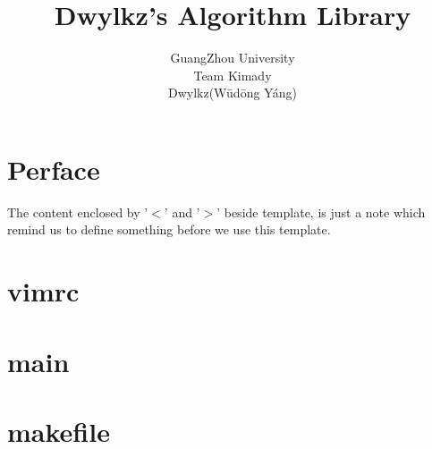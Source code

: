 



\title{\bf Dwylkz's Algorithm Library}
\author{GuangZhou University\\Team Kimady\\{Dwylkz(W\=ud\=ong Y\'ang)}}
\maketitle

\tableofcontents
\newpage
{}

\section{Perface}
  The content enclosed by '$<$' and '$>$' beside template, is
  just a note which remind us to define something before
  we use this template.

\section{vimrc}


\section{main}


\section{makefile}






